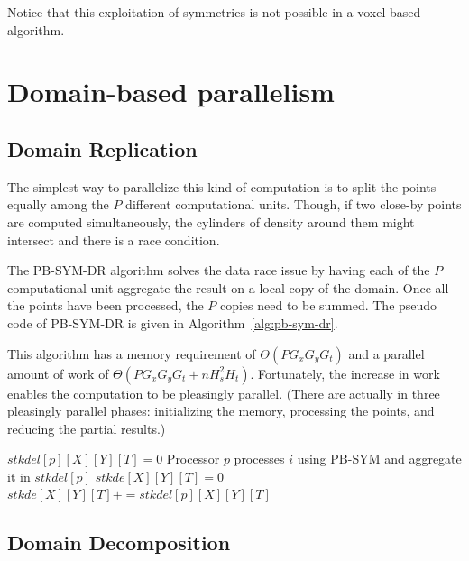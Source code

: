 \documentclass{article}
\begin{document}
Notice that this exploitation of symmetries is not possible in a
voxel-based algorithm.

\label{sec:algo-pb-sym}


\section{Domain-based parallelism}
\label{sec:pb-sym-domain}

\subsection{Domain Replication}

The simplest way to parallelize this kind of computation is to split
the points equally among the $P$ different computational
units. Though, if two close-by points are computed
simultaneously, the cylinders of density around them might intersect and
there is a race condition.

The PB-SYM-DR algorithm solves the data race issue by having each of
the $P$ computational unit aggregate the result on a local copy of the
domain. Once all the points have been processed, the $P$ copies need
to be summed. The pseudo code of PB-SYM-DR is given in
Algorithm~\ref{alg:pb-sym-dr}.

This algorithm has a memory requirement of $\Theta (P  G_x  G_y  G_t)$
and a parallel amount of work of $\Theta (P  G_x  G_y  G_t + n  H_s^2
 H_t)$. Fortunately, the increase in work enables the computation to be
pleasingly parallel. (There are actually in three pleasingly parallel phases:
initializing the memory, processing the points, and reducing the partial results.)

\begin{algorithm}
\caption{\textsc{PB-SYM-DR}}
\begin{algorithmic}
    \State $stkdel[p][X][Y][T] = 0$
  \EndFor
\EndFor
%
  \State Processor $p$ processes $i$ using PB-SYM and aggregate it in $stkdel[p]$
\EndFor
%
  \State $stkde[X][Y][T] = 0$
    \State $stkde[X][Y][T] += stkdel[p][X][Y][T]$
  \EndFor
\EndFor
\end{algorithmic}
\label{alg:pb-sym-dr}
\end{algorithm}

\subsection{Domain Decomposition}
\label{sec:pb-sym-dd}
\end{document}
